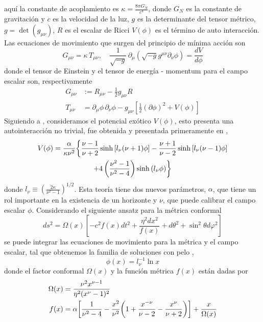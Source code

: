 \documentclass[../Main.tex]{subfiles}
\begin{document}
aquí la constante de acoplamiento es $\kappa=\frac{8\pi G_{N}}{c^{4}}$, donde $G_N$ es la constante de gravitación y $c$ es la velocidad de la luz, $g$ es la determinante del tensor métrico, $g=\det (g_{\mu\nu})$, $R$ es el escalar de Ricci $V(\phi)$ es el término de auto interacción.
%
Las ecuaciones de movimiento que surgen del principio de mínima acción son
%
\begin{equation}
  G_{\mu\nu}
  =\kappa\,T_{\mu\nu}, \quad
  \frac{1}{\sqrt{-g}}\,\partial_{\mu}
  \left(\sqrt{-g}g^{\mu\nu}\partial_{\nu}\phi\right)
  =\frac{dV}{d\phi}
\end{equation}
%
donde el tensor de Einstein y el tensor de energía - momentum para el campo escalar son, respectivamente 
%
\begin{equation}
  \begin{split}
    G_{\mu\nu} & :=R_{\mu\nu}-\frac{1}{2}g_{\mu\nu}R \\
    T_{\mu\nu} & =
    \partial_{\mu}\phi\,\partial_{\nu}\phi
    -g_{\mu\nu}\left[\frac{1}{2}\left(\partial\phi\right)^2
      +V(\phi)\right]
  \end{split}
\end{equation}
%
Siguiendo a \cite{Anabalon:2013eaa,Anabalon:2017yhv,Anabalon:2012ih,Anabalon:2016izw}, 
consideramos el potencial exótico $V(\phi)$, esto presenta una autointeracción no trivial, fue obtenida y presentada primeramente en \cite{Anabalon:2013eaa},
%
\begin{multline}
  V(\phi)=\frac{\alpha}{\kappa\nu^2}\biggl{\{}\frac{\nu-1}{\nu+2}\sinh{\left[l_\nu(\nu+1)\phi\right]}-\frac{\nu+1}{\nu-2}\sinh{[l_{\nu}(\nu-1)\phi]}
  \\+4\left(\frac{\nu^{2}-1}{\nu^{2}-4}\right)\sinh{(l_\nu\phi)}
  \biggr{\}}
  \label{pot1}
\end{multline}
%
donde $l_{\nu}\equiv\left(\frac{2\kappa}{\nu^{2}-1}\right)^{1/2}$. Esta teoría tiene dos nuevos parámetros, $\alpha$, que tiene un rol importante en la existencia de un horizonte y $\nu$, que puede calibrar el campo escalar $\phi$.
Considerando el siguiente ansatz para la métrica conformal
%
\begin{equation}
  ds^{2}=\Omega(x)\left[  -c^{2}f(x)dt^{2}+\frac{\eta^{2}dx^{2}}{f(x)}+d\theta
  ^{2}+\sin^{2}\theta d\varphi^{2}\right]  \label{Ansatz}%
\end{equation}
%
se puede integrar las ecuaciones de movimiento para la métrica y el campo escalar, tal que obtenemos la familia de soluciones con pelo \cite{Anabalon:2013sra,Anabalon:2013qua,Acena:2012mr,Acena:2013jya},
%
\begin{equation}
  \phi(x)=l_{\nu}^{-1}\ln{x}
\end{equation}
%
donde el factor conformal $\Omega(x)$ y la función métrica $f(x)$ están dadas por
\begin{equation}
  \begin{split}
    \Omega(x) & =\frac{\nu^{2}x^{\nu-1}}{\eta^{2}(x^{\nu}-1)^{2}} \\
    f(x) & =\alpha\biggl{[}\frac{1}{\nu^{2}-4}-\frac{x^{2}}{\nu^{2}%
    }\biggl{(}1+\frac{x^{-\nu}}{\nu-2}-\frac{x^\nu}{\nu+2}%
    \biggr{)}\biggr{]} +\frac{x}{\Omega(x)}
    \label{omega}
  \end{split}
\end{equation}
\end{document}
